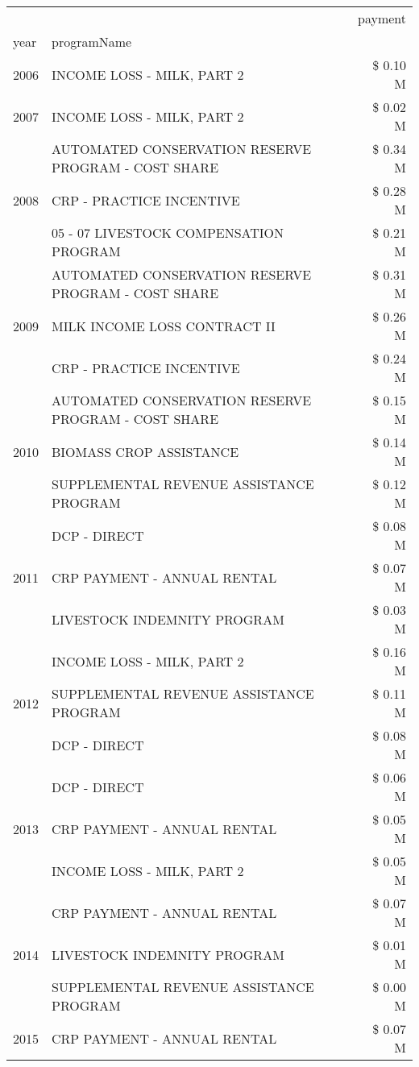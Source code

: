 \begin{tabular}{llr}
\toprule
 &  & payment \\
year & programName &  \\
\midrule
2006 & INCOME LOSS - MILK, PART 2 & \$ 0.10 M \\
\cline{1-3}
2007 & INCOME LOSS - MILK, PART 2 & \$ 0.02 M \\
\cline{1-3}
\multirow[t]{3}{*}{2008} & AUTOMATED CONSERVATION RESERVE PROGRAM - COST SHARE & \$ 0.34 M \\
 & CRP - PRACTICE INCENTIVE & \$ 0.28 M \\
 & 05 - 07 LIVESTOCK COMPENSATION PROGRAM & \$ 0.21 M \\
\cline{1-3}
\multirow[t]{3}{*}{2009} & AUTOMATED CONSERVATION RESERVE PROGRAM - COST SHARE & \$ 0.31 M \\
 & MILK INCOME LOSS CONTRACT II & \$ 0.26 M \\
 & CRP - PRACTICE INCENTIVE & \$ 0.24 M \\
\cline{1-3}
\multirow[t]{3}{*}{2010} & AUTOMATED CONSERVATION RESERVE PROGRAM - COST SHARE & \$ 0.15 M \\
 & BIOMASS CROP ASSISTANCE & \$ 0.14 M \\
 & SUPPLEMENTAL REVENUE ASSISTANCE PROGRAM & \$ 0.12 M \\
\cline{1-3}
\multirow[t]{3}{*}{2011} & DCP - DIRECT & \$ 0.08 M \\
 & CRP PAYMENT - ANNUAL RENTAL & \$ 0.07 M \\
 & LIVESTOCK INDEMNITY PROGRAM & \$ 0.03 M \\
\cline{1-3}
\multirow[t]{3}{*}{2012} & INCOME LOSS - MILK, PART 2 & \$ 0.16 M \\
 & SUPPLEMENTAL REVENUE ASSISTANCE PROGRAM & \$ 0.11 M \\
 & DCP - DIRECT & \$ 0.08 M \\
\cline{1-3}
\multirow[t]{3}{*}{2013} & DCP - DIRECT & \$ 0.06 M \\
 & CRP PAYMENT - ANNUAL RENTAL & \$ 0.05 M \\
 & INCOME LOSS - MILK, PART 2 & \$ 0.05 M \\
\cline{1-3}
\multirow[t]{3}{*}{2014} & CRP PAYMENT - ANNUAL RENTAL & \$ 0.07 M \\
 & LIVESTOCK INDEMNITY PROGRAM & \$ 0.01 M \\
 & SUPPLEMENTAL REVENUE ASSISTANCE PROGRAM & \$ 0.00 M \\
\cline{1-3}
\multirow[t]{3}{*}{2015} & CRP PAYMENT - ANNUAL RENTAL & \$ 0.07 M \\

\end{tabular}
